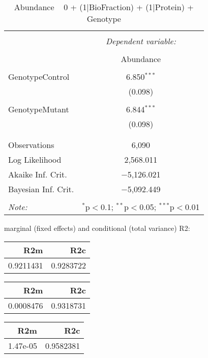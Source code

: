 \documentclass[11pt]{report}
\begin{document}
\begin{table}[!htbp] \centering 
  \caption{Abundance ~ 0 + (1|BioFraction) + (1|Protein) + Genotype} 
  \label{} 
\begin{tabular}{@{\extracolsep{5pt}}lc} 
\\[-1.8ex]\hline 
\hline \\[-1.8ex] 
 & \multicolumn{1}{c}{\textit{Dependent variable:}} \\ 
\cline{2-2} 
\\[-1.8ex] & Abundance \\ 
\hline \\[-1.8ex] 
 GenotypeControl & 6.850$^{***}$ \\ 
  & (0.098) \\ 
  & \\ 
 GenotypeMutant & 6.844$^{***}$ \\ 
  & (0.098) \\ 
  & \\ 
\hline \\[-1.8ex] 
Observations & 6,090 \\ 
Log Likelihood & 2,568.011 \\ 
Akaike Inf. Crit. & $-$5,126.021 \\ 
Bayesian Inf. Crit. & $-$5,092.449 \\ 
\hline 
\hline \\[-1.8ex] 
\textit{Note:}  & \multicolumn{1}{r}{$^{*}$p$<$0.1; $^{**}$p$<$0.05; $^{***}$p$<$0.01} \\ 
\end{tabular} 
\end{table} 
marginal (fixed effects) and conditional (total variance) R2:

\begin{tabular}{r|r}
\hline
R2m & R2c\\
\hline
0.9211431 & 0.9283722\\
\hline
\end{tabular}

\begin{tabular}{r|r}
\hline
R2m & R2c\\
\hline
0.0008476 & 0.9318731\\
\hline
\end{tabular}

\begin{tabular}{r|r}
\hline
R2m & R2c\\
\hline
1.47e-05 & 0.9582381\\
\hline
\end{tabular}
\end{document}
